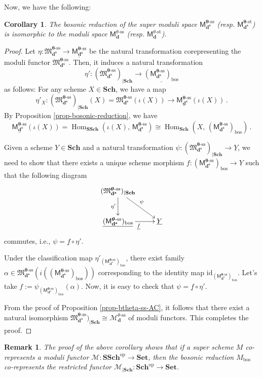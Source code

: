 \documentclass[12pt, reqno]{amsart}
\theoremstyle{plain}
\newtheorem{cor}[theorem]{Corollary}
\newtheorem{remark}[theorem]{Remark}
\numberwithin{equation}{section}
\def \d{\mathbf{d}}
\def \sd{\mathbf{d^s}}
\def \ra{\rightarrow}
\def \btheta{\boldsymbol{\theta}}
\newcommand{\Hom}{\operatorname{Hom}\nolimits}
\newcommand{\smfss}{\mathfrak{M}_{\sd}^{\btheta\text{-}\mathrm{ss}}}
\newcommand{\smss}{\mathsf{M}_{\sd}^{\btheta\text{-}\mathrm{ss}}}
\newcommand{\sms}{\mathsf{M}_{\sd}^{\btheta\text{-}\mathrm{st}}}
\newcommand{\SSch}{\mathbf{SSch}}
\newcommand{\Sch}{\mathbf{Sch}}
\newcommand{\Set}{\mathbf{Set}}
\newcommand{\Ms}{\mathcal{M}}
\newcommand{\fp}[1]{\underline{#1}}%
\begin{document}
Now, we have the following:

\begin{cor}The bosonic reduction of the super moduli space $\smss$ (resp. $\sms$) is isomorphic to the moduli space $\mathsf{M}^{{\theta}\text{-}\mathrm{ss}}_\d$ (resp. $\mathsf{M}^{{\theta}\text{-}\mathrm{st}}_\d$).
\end{cor}
\begin{proof}
Let $\eta \colon \smfss \ra \fp{\smss}$ be the natural transformation corepresenting the moduli functor $\smfss$.
Then, it induces a natural transformation
\[
\eta' : (\smfss)_{|\Sch} \ra \fp{(\smss)_{\mathrm{bos}}}
\]
as follows:
For any scheme $X\in \Sch$, we have a map
\[
\eta'_X : (\smfss)_{|\Sch}(X) = \smfss(\iota(X)) \ra \fp{\smss}(\iota(X))\,.
\]
By Proposition \ref{prop-bosonic-reduction}, we have
$$
\fp{\smss}(\iota(X)) = \Hom_{\SSch}(\iota(X),\, \smss) \cong
\Hom_{\Sch}(X,\, (\smss)_{\mathrm{bos}})\,.
$$

Given a scheme $Y \in \Sch$ and a natural transformation
$\psi : (\smfss)_{|\Sch} \ra \fp{Y}$, we need to show that 
there exists a unique scheme morphism $f: (\smss)_{\mathrm{bos}} \ra Y$ such that the following diagram
\[
\xymatrix{
(\smfss)_{|\Sch} \ar[d]_{\eta'} \ar[rd]^\psi \\
\fp{(\smss)_{\mathrm{bos}}} \ar[r]_{\underline{f}} & \fp{Y}
}
\]
commutes, i.e., $\psi = \fp{f} \circ \eta'$.

Under the classification map $\eta'_{(\smss)_{\mathrm{bos}}}$, 
there exist family $\alpha \in \smfss(i((\smss)_{\mathrm{bos}}))$ corresponding to the identity map $\mathrm{id}_{(\smss)_{\mathrm{bos}}}$.
Let's take $f := \psi_{(\smss)_{\mathrm{bos}}}(\alpha)$.
Now, it is easy to check that $\psi = \fp{f} \circ \eta'$.

From the proof of Proposition \ref{prop-btheta-ss-AC}, it follows that there exist a natural isomorphism $\smfss)_{|\Sch} \cong \Ms^{\theta\text{-}\mathrm{ss}}_\d$ of moduli functors. This completes the proof.
\end{proof}

\begin{remark}{\rm 
The proof of the above corollary shows that if a super scheme $M$ co-represents a moduli functor $\Ms \colon \SSch^\text{op} \ra \Set$, then the bosonic reduction $M_\mathrm{bos}$ co-represents the restricted functor $\Ms_{|\Sch} \colon \Sch^\text{op} \ra \Set$.
}
\end{remark}
\end{document}
